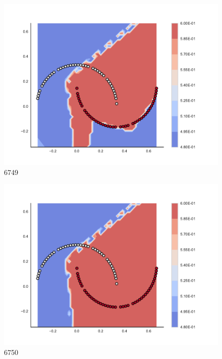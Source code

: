 \begin{subfigure}[b]{0.09\textwidth}
    \includegraphics[clip, trim=2.35cm 1.75cm 4.5cm 0cm,width=\textwidth]{img/convergence/6749.pdf}
    \caption{6749}
    \label{fig:convergence_6749}
\end{subfigure}
%
\begin{subfigure}[b]{0.09\textwidth}
    \includegraphics[clip, trim=2.35cm 1.75cm 4.5cm 0cm,width=\textwidth]{img/convergence/6750.pdf}
    \caption{6750}
    \label{fig:convergence_6750}
\end{subfigure}
%
